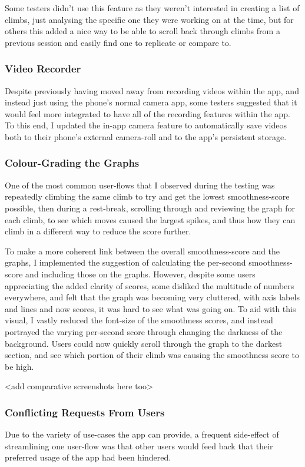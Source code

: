 Some testers didn't use this feature as they weren't interested in creating a list of climbs, just analysing the specific one they were working on at the time, but for others this added a nice way to be able to scroll back through climbs from a previous session and easily find one to replicate or compare to.


\subsubsection{Video Recorder}
Despite previously having moved away from recording videos within the app, and instead just using the phone's normal camera app, some testers suggested that it would feel more integrated to have all of the recording features within the app.
To this end, I updated the in-app camera feature to automatically save videos both to their phone's external camera-roll and to the app's persistent storage.


\subsubsection{Colour-Grading the Graphs}
One of the most common user-flows that I observed during the testing was repeatedly climbing the same climb to try and get the lowest smoothness-score possible, then during a rest-break, scrolling through and reviewing the graph for each climb, to see which moves caused the largest spikes, and thus how they can climb in a different way to reduce the score further.

To make a more coherent link between the overall smoothness-score and the graphs, I implemented the suggestion of calculating the per-second smoothness-score and including those on the graphs.
However, despite some users appreciating the added clarity of scores, some disliked the multitude of numbers everywhere, and felt that the graph was becoming very cluttered, with axis labels and lines and now scores, it was hard to see what was going on.
To aid with this visual, I vastly reduced the font-size of the smoothness scores, 
and instead portrayed the varying per-second score through changing the darkness of the background.
Users could now quickly scroll through the graph to the darkest section, and see which portion of their climb was causing the smoothness score to be high.


<add comparative screenshots here too>



\subsubsection{Conflicting Requests From Users}
Due to the variety of use-cases the app can provide, a frequent side-effect of streamlining one user-flow was that other users would feed back that their preferred usage of the app had been hindered.

